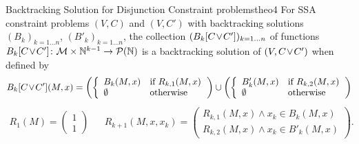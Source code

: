 \begin{theorem}{Backtracking Solution for Disjunction Constraint problems}{theo4}
    For SSA constraint problems $(V,C)$ and $(V,C')$ with backtracking
    solutions $(B_k)_{k=1\dots n}$, $(B'_k)_{k=1\dots n}$, the collection
    $(B_k[C\hspace{-0.5mm}\lor\hspace{-0.5mm}C'])_{k=1\dots n}$ of functions
    \mbox{$B_k[C\hspace{-0.5mm}\lor\hspace{-0.5mm}C']\colon\mathcal M\times\mathbb N^{k-1}\rightarrow\mathcal P(\mathbb N)$}
    is a backtracking solution of
    $(V,C\hspace{-0.5mm}\lor\hspace{-0.5mm}C')$ when defined by
    \begin{align*}
        B_k[C\hspace{-0.5mm}\lor\hspace{-0.5mm}C'](M,x)=\left(\left\{
            \begin{array}{ll}
                B_k(M,x)&\text{if }R_{k,1}(M,x)\\
                \emptyset&\text{otherwise}
            \end{array}\right.
            \right)\cup\left(\left\{
            \begin{array}{ll}
                B'_k(M,x)&\text{if }R_{k,2}(M,x)\\
                \emptyset&\text{otherwise}
            \end{array}\right.
            \right)
    \end{align*}
    \vspace{-0.2cm}
    \begin{align*}
        R_1(M)=\left(\begin{array}{l}1\\1\end{array}\right)&&
        R_{k+1}(M,x,x_k)=\left(
            \begin{array}{l}
                R_{k,1}(M,x)\mathrel\land x_k\in B_k(M,x)\\
                R_{k,2}(M,x)\mathrel\land x_k\in B'_k(M,x)
            \end{array}\right).
    \end{align*}
    \tcblower

\end{theorem}
